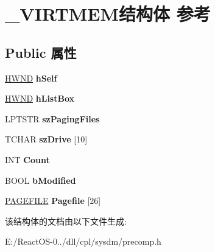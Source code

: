 \hypertarget{struct___v_i_r_t_m_e_m}{}\section{\+\_\+\+V\+I\+R\+T\+M\+E\+M结构体 参考}
\label{struct___v_i_r_t_m_e_m}
\subsection*{Public 属性}
\begin{DoxyCompactItemize}
\item 
\mbox{\label{struct___v_i_r_t_m_e_m_a21373fd81ee5bb8fade8cf49e4a240bc}} 
\hyperlink{interfacevoid}{H\+W\+ND} {\bfseries h\+Self}
\item 
\mbox{\label{struct___v_i_r_t_m_e_m_af01a09fe70d880f4e7fb1e94573156fe}} 
\hyperlink{interfacevoid}{H\+W\+ND} {\bfseries h\+List\+Box}
\item 
\mbox{\label{struct___v_i_r_t_m_e_m_ae14f114c5bbc8b7e33c879272e78fec2}} 
L\+P\+T\+S\+TR {\bfseries sz\+Paging\+Files}
\item 
\mbox{\label{struct___v_i_r_t_m_e_m_a8174e1094ae8f162846e4395baae3828}} 
T\+C\+H\+AR {\bfseries sz\+Drive} \mbox{[}10\mbox{]}
\item 
\mbox{\label{struct___v_i_r_t_m_e_m_a5e82372d506bf2c539370731eb85379f}} 
I\+NT {\bfseries Count}
\item 
\mbox{\label{struct___v_i_r_t_m_e_m_abb57ad9ebfbe58c6207fe9aa969a3fbb}} 
B\+O\+OL {\bfseries b\+Modified}
\item 
\mbox{\label{struct___v_i_r_t_m_e_m_a1022eca31adf934dbf603d281b3078a5}} 
\hyperlink{struct___p_a_g_e_f_i_l_e}{P\+A\+G\+E\+F\+I\+LE} {\bfseries Pagefile} \mbox{[}26\mbox{]}
\end{DoxyCompactItemize}


该结构体的文档由以下文件生成\+:\begin{DoxyCompactItemize}
\item 
E\+:/\+React\+O\+S-\/0../dll/cpl/sysdm/precomp.\+h\end{DoxyCompactItemize}
